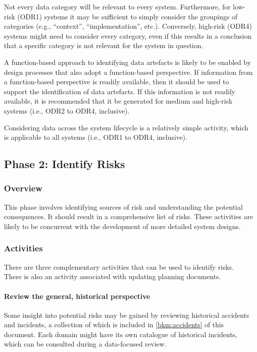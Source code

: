 Not every data category will be relevant to every system. Furthermore, for low-risk (ODR1) systems it may be sufficient to simply consider the groupings of categories (e.g., ``context'', ``implementation'', etc.). Conversely, high-risk (ODR4) systems might need to consider every category, even if this results in a conclusion that a specific category is not relevant for the system in question.

A function-based approach to identifying \glspl{data artefact} is likely to be enabled by design processes that also adopt a function-based perspective. If \gls{information} from a function-based perspective is readily available, then it should be used to support the identification of \glspl{data artefact}. If this \gls{information} is not readily available, it is recommended that it be generated for medium and high-risk systems (i.e., ODR2 to ODR4, inclusive).

Considering data across the system lifecycle is a relatively simple activity, which is applicable to all systems (i.e., ODR1 to ODR4, inclusive).

\clearpage
\subsection{Phase 2: Identify Risks}
\subsubsection{Overview}
This phase involves identifying sources of risk and understanding the potential consequences. It should result in a comprehensive list of risks. These activities are likely to be concurrent with the development of more detailed system designs.

\subsubsection{Activities}
There are three complementary activities that can be used to identify risks. There is also an activity associated with updating planning documents.

\paragraph{Review the general, historical perspective}
Some insight into potential risks may be gained by reviewing historical accidents and incidents, a collection of which is included in
\autoref{bkm:accidents} of this document. Each domain might have its own catalogue of historical incidents, which can be consulted during a data-focused review.

